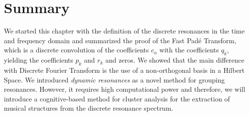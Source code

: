 \section{Summary}
We started this chapter with the definition of the discrete resonances in the time and frequency domain and summarized the proof of the Fast Padé Transform, which is a discrete convolution of the coefficients $c_n$ with the coefficients $q_k$, yielding the coefficients $p_k$ and $r_k$ and zeros. We showed that the main difference with Discrete Fourier Transform is the use of a non-orthogonal basis in a Hilbert Space. We introduced \textit{dynamic resonances} as a novel method for grouping resonances. However, it requires high computational power and therefore, we will introduce a cognitive-based method for cluster analysis for the extraction of musical structures from the discrete resonance spectrum.



